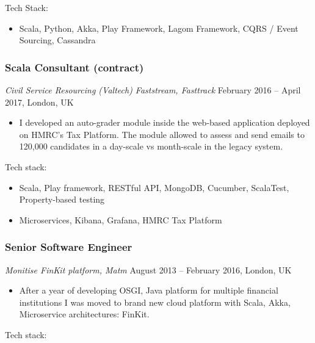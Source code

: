 \documentclass[
]{rss}
\providecommand{\tightlist}{%
  \setlength{\itemsep}{0pt}\setlength{\parskip}{0pt}}
\begin{document}
\begin{resume}
Tech Stack:

\begin{itemize}
\tightlist
\item
  Scala, Python, Akka, Play Framework, Lagom Framework, CQRS / Event
  Sourcing, Cassandra
\end{itemize}

\hypertarget{scala-consultant-contract}{%
\subsubsection{Scala Consultant
(contract)}\label{scala-consultant-contract}}

\emph{Civil Service Resourcing (Valtech) \textbar{} Faststream,
Fasttrack} February 2016 -- April 2017, London, UK

\begin{itemize}
\tightlist
\item
  I developed an auto-grader module inside the web-based application
  deployed on HMRC's Tax Platform. The module allowed to assess and send
  emails to 120,000 candidates in a day-scale vs month-scale in the
  legacy system.
\end{itemize}

Tech stack:

\begin{itemize}
\tightlist
\item
  Scala, Play framework, RESTful API, MongoDB, Cucumber, ScalaTest,
  Property-based testing
\item
  Microservices, Kibana, Grafana, HMRC Tax Platform
\end{itemize}

\hypertarget{senior-software-engineer}{%
\subsubsection{Senior Software
Engineer}\label{senior-software-engineer}}

\emph{Monitise \textbar{} FinKit platform, Matm} August 2013 -- February
2016, London, UK

\begin{itemize}
\tightlist
\item
  After a year of developing OSGI, Java platform for multiple financial
  institutions I was moved to brand new cloud platform with Scala, Akka,
  Microservice architectures: FinKit.
\end{itemize}

Tech stack:


\end{resume}
\end{document}
